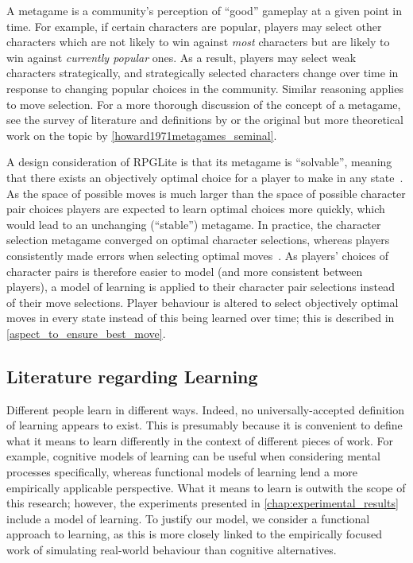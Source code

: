 \label{metagame_explanation}
A metagame is a community's perception of ``good'' gameplay at a given point in
time. For example, if certain characters are popular, players may select other
characters which are not likely to win against \emph{most} characters but are
likely to win against \emph{currently popular} ones. As a result, players may
select weak characters strategically, and strategically selected characters
change over time in response to changing popular choices in the community.
Similar reasoning applies to move selection. For a more thorough discussion of
the concept of a metagame, see the survey of literature and definitions by
\citet{metagaming_in_esports} or the original but more theoretical work on the
topic by \cref{howard1971metagames_seminal}.

A design consideration of RPGLite is that its metagame is ``solvable'', meaning
that there exists an objectively optimal choice for a player to make in any
state~\cite{kavanagh2021thesis}. As the space of possible moves is much larger
than the space of possible character pair choices players are expected to learn
optimal choices more quickly, which would lead to an unchanging (``stable'')
metagame. In practice, the character selection metagame converged on optimal
character selections, whereas players consistently made errors when selecting
optimal moves~\cite{kavanagh2021gameplay}. As players' choices of character
pairs is therefore easier to model (and more consistent between players), a
model of learning is applied to their character pair selections instead of their
move selections. Player behaviour is altered to select objectively optimal moves
in every state instead of this being learned over time; this is described in
\cref{aspect_to_ensure_best_move}.



\subsection{Literature regarding Learning}
\label{subsec:models_of_learning_discussed}

Different people learn in different ways. Indeed, no universally-accepted
definition of learning appears to exist. This is presumably because it is
convenient to define what it means to learn differently in the context of
different pieces of work. For example, cognitive models of learning can be
useful when considering mental processes specifically, whereas functional models
of learning lend a more empirically applicable perspective. What it means to
learn is outwith the scope of this research; however, the experiments presented
in \cref{chap:experimental_results} include a model of learning. To justify our
model, we consider a functional approach to learning, as this is more closely
linked to the empirically focused work of simulating real-world behaviour than
cognitive alternatives.

